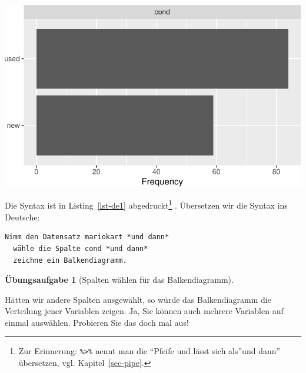 \documentclass[
  a4paper,
  DIV=11]{scrreprt}
\theoremstyle{definition}
\newtheorem{exercise}{Übungsaufgabe}[chapter]
\theoremstyle{definition}
\theoremstyle{definition}
\theoremstyle{remark}
\begin{document}
\includegraphics{040-verbildlichen_files/figure-pdf/unnamed-chunk-8-1.pdf}

Die Syntax ist in Listing~\ref{lst-de1} abgedruckt\footnote{Zur
  Erinnerung: \texttt{\%\textgreater{}\%} nennt man die ``Pfeife und
  lässt sich als''und dann'' übersetzen, vgl. Kapitel~\ref{sec-pipe}.} .
Übersetzen wir die Syntax ins Deutsche:

\begin{verbatim}
Nimm den Datensatz mariokart *und dann*
  wähle die Spalte cond *und dann*
  zeichne ein Balkendiagramm.
\end{verbatim}

\begin{exercise}[Spalten wählen für das
Balkendiagramm]\protect\hypertarget{exr-de1}{}\label{exr-de1}

Hätten wir andere Spalten ausgewählt, so würde das Balkendiagramm die
Verteilung jener Variablen zeigen. Ja, Sie können auch mehrere Variablen
auf einmal auswählen. Probieren Sie das doch mal aus!

\end{exercise}
\end{document}
